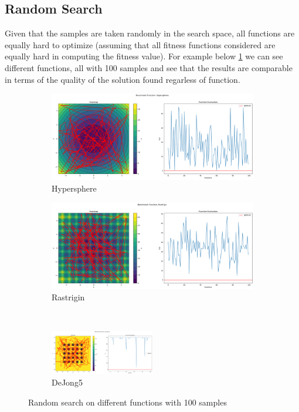 \subsection{Random Search}
\label{sec:random-search}
Given that the samples are taken randomly in the search space, all functions are equally hard to optimize (assuming that all fitness functions considered are equally hard in computing the fitness value). For example below \ref{fig:rs-100} we can see different functions, all with 100 samples and see that the results are comparable in terms of the quality of the solution found regarless of function.

\begin{figure}[H]
    \begin{subfigure}{0.5\textwidth}
        \includegraphics[width=\textwidth]{lab1/imgs/rs_sphere_100.png}
        \caption{Hypersphere}
    \end{subfigure}
    \begin{subfigure}{0.5\textwidth}
        \includegraphics[width=\textwidth]{lab1/imgs/rs_rastrigin_100.png}
        \caption{Rastrigin}
    \end{subfigure} \\
    \begin{subfigure}{\textwidth}
        \centering
        \includegraphics[width=0.5\textwidth]{lab1/imgs/rs_dejong_100.png}
        \caption{DeJong5}
    \end{subfigure}
    \caption{Random search on different functions with 100 samples}
    \label{fig:rs-100}
\end{figure}

